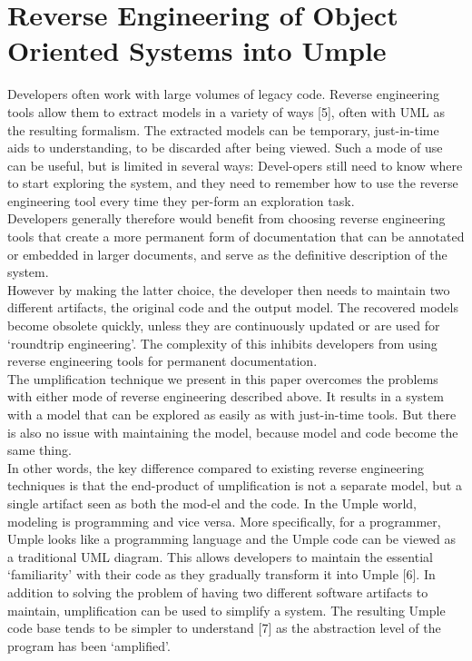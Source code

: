\lhead{\emph{\leftmark}}  %
\chapter{Reverse Engineering of Object Oriented Systems into Umple}

Developers often work with large volumes of legacy code. Reverse engineering tools allow them to extract models in a variety of ways [5], often with UML as the resulting formalism.
The extracted models can be temporary, just-in-time aids to understanding, to be discarded after being viewed. Such a mode of use can be useful, but is limited in several ways: Devel-opers still need to know where to start exploring the system, and they need to remember how to use the reverse engineering tool every time they per-form an exploration task. \\
Developers generally therefore would benefit from choosing reverse engineering tools that create a more permanent form of documentation that can be annotated or embedded in larger documents, and serve as the definitive description of the system. \\
However by making the latter choice, the developer then needs to maintain two different artifacts, the original code and the output model. The recovered models become obsolete quickly, unless they are continuously updated or are used for ‘roundtrip engineering’.  The complexity of this inhibits developers from using reverse engineering tools for permanent documentation.\\
The umplification technique we present in this paper overcomes the problems with either mode of reverse engineering described above. It results in a system with a model that can be explored as easily as with just-in-time tools. But there is also no issue with maintaining the model, because model and code become the same thing.\\
In other words, the key difference compared to existing reverse engineering techniques is that the end-product of umplification is not a separate model, but a single artifact seen as both the mod-el and the code. In the Umple world, modeling is programming and vice versa. More specifically, for a programmer, Umple looks like a programming language and the Umple code can be viewed as a traditional UML diagram. This allows developers to maintain the essential ‘familiarity’ with their code as they gradually transform it into Umple [6]. 
In addition to solving the problem of having two different software artifacts to maintain,   umplification can be used to simplify a system. The resulting Umple code base tends to be simpler to understand [7] as the abstraction level of the program has been ‘amplified’.


